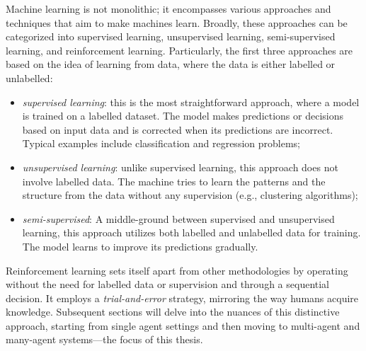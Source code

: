 Machine learning is not monolithic; 
 it encompasses various approaches and techniques that aim to make machines learn. 
 Broadly, these approaches can be categorized into supervised learning, unsupervised learning, semi-supervised learning, and reinforcement learning.
%
Particularly, the first three approaches are based on the idea of learning from data, 
 where the data is either labelled or unlabelled:
\begin{itemize}
  \item \emph{supervised learning}: this is the most straightforward approach, where a model is trained on a labelled dataset. 
  The model makes predictions or decisions based on input data and is corrected when its predictions are incorrect. Typical examples include classification and regression problems;
  \item \emph{unsupervised learning}: unlike supervised learning, this approach does not involve labelled data. 
  The machine tries to learn the patterns and the structure from the data without any supervision (e.g., clustering algorithms);
  \item \emph{semi-supervised}: A middle-ground between supervised and unsupervised learning, this approach utilizes both labelled and unlabelled data for training. The model learns to improve its predictions gradually.
\end{itemize}
Reinforcement learning sets itself apart from other methodologies by operating without the need for labelled data or supervision and through a sequential decision. 
 It employs a \emph{trial-and-error} strategy, mirroring the way humans acquire knowledge. 
 Subsequent sections will delve into the nuances of this distinctive approach, starting from single agent settings and then moving to multi-agent and many-agent systems---the focus of this thesis.
